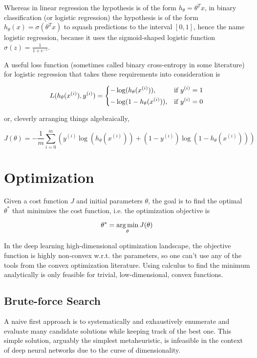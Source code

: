 Whereas in linear regression the hypothesis is of the form $h_{\theta} = \theta^Tx$, in binary classification (or logistic regression) the hypothesis is of the form $h_{\theta}(x) = \sigma(\theta^Tx)$ to squash predictions to the interval $[0, 1]$, hence the name logistic regression, because it uses the sigmoid-shaped logistic function $\sigma(z) = \frac{1}{1 + e^{-z}}$.

A useful loss function (sometimes called binary cross-entropy in some literature) for logistic regression that takes these requirements into consideration is

$$
L(h_{\theta}(x^{(i)}), y^{(i)}) =
\begin{dcases}
    -\log(h_{\theta}(x^{(i)})),& \text{if } y^{(i)} = 1\\
    -\log(1 - h_{\theta}(x^{(i)})),& \text{if } y^{(i)} = 0
\end{dcases}
$$

or, cleverly arranging things algebraically,

$$
J(\theta) = -\frac{1}{m} \sum_{i=0}^{m} ( y^{(i)}\log(h_{\theta}(x^{(i)})) + (1 - y^{(i)})\log(1 - h_{\theta}(x^{(i)})) )
$$

\section{Optimization}

Given a cost function $J$ and initial parameters $\theta$, the goal is to find the optimal $\theta^*$ that minimizes the cost function, i.e. the optimization objective is

$$
\theta^{*} = \operatorname*{arg\,min}_{\theta} J(\theta)
$$

In the deep learning high-dimensional optimization landscape, the objective function is highly non-convex w.r.t. the parameters, so one can't use any of the tools from the convex optimization literature. Using calculus to find the minimum analytically is only feasible for trivial, low-dimensional, convex functions.

\subsection{Brute-force Search}

A naive first approach is to systematically and exhaustively enumerate and evaluate many candidate solutions while keeping track of the best one. This simple solution, arguably the simplest metaheuristic, is infeasible in the context of deep neural networks due to the curse of dimensionality.

